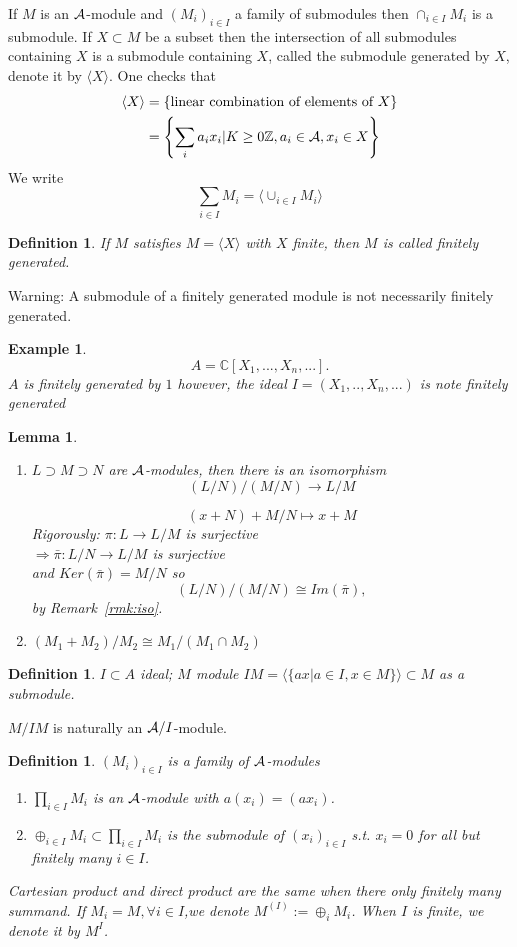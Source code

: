 \documentclass[11pt]{article}
\newtheorem{lemma}[thm]{Lemma}
\newtheorem{dfn}[thm]{Definition}
\newtheorem{ex}[thm]{Example}
\newcommand{\cplx}{\mathbb C}
\newcommand{\intg}{\mathbb Z}
\newcommand{\cala}{{\cal A}}
\newcommand{\rta}{\rightarrow}
\newcommand{\Lrta}{\Longrightarrow}
\newcommand{\lrta}{\longrightarrow}
\newcommand{\lgl}{\langle}
\newcommand{\rgl}{\rangle}
\begin{document}
If $M$ is an $\cala$-module and $(M_i)_{i\in I} $ a family of submodules then $\cap_{i\in I} M_i$ is a submodule.
If $X\subset M$ be a  subset then the intersection of all submodules  containing $X$ is a submodule containing $X$, called the  submodule generated by $X$, denote it by $\lgl X\rgl$.
One checks that 
$$
\begin{aligned}
\lgl X\rgl&=\left\{\text{linear combination of elements of } X\right\}\\
&=\left\{\sum_i a_i x_i|K\geq 0 \intg, a_i\in\cala, x_i\in X\right\}
\end{aligned}
$$
We write 
$$
\sum_{i\in I} M_i=\lgl \cup_{i\in I} M_i\rgl
$$
\begin{dfn}
If $M$ satisfies $M=\lgl X\rgl$ with $X$ finite, then $M$ is called finitely generated.
\end{dfn}
Warning:   A submodule of a finitely generated module is not necessarily finitely generated.
\begin{ex}
$$
A=\cplx[X_1,...,X_n,...].
$$
$A$ is finitely generated by $1$ however, the ideal 
$
I=(X_1,..,X_n,...) $ is note finitely generated
\end{ex}

\begin{lemma}\ 
\begin{enumerate}
    \item $L\supset M\supset N$ are $\cala$-modules, then there is an isomorphism 
    $$
        (L/N)/(M/N)\rta L/M
    $$

    $$
    (x+N)+M/N\mapsto x+M
    $$
    Rigorously:
    $\pi: L\lrta L/M$ is surjective\\
    $\Lrta \bar{\pi} :L/N\rta L/M$ is surjective\\
    and $Ker(\bar{\pi})=M/N$ so
     $$
     (L/N)/(M/N)\cong Im(\bar{\pi}),
     $$
     by Remark~\ref{rmk:iso}.
    \item $(M_1+M_2)/M_2\cong M_1/(M_1\cap M_2)$
\end{enumerate}
\end{lemma}
\begin{dfn}
$I\subset A$ ideal; $M$ module $I M=\lgl \{ax|a\in I,x\in M\}\rgl\subset M$ as a submodule.
\end{dfn}
$M/IM$ is naturally an $\cala/I$-module.

\begin{dfn}
$(M_i)_{i \in I}$ is a family of $\cala$-modules
\begin{enumerate}
\item $\prod_{i\in I} M_i$ is an $\cala$-module with $a(x_i)=(a x_i)$.
\item $\oplus_{i\in I} M_i\subset \prod_{i\in I} M_i$ is the submodule of $(x_i)_{i\in I}$ s.t. $x_i=0$ for all but finitely many $i\in I$. 
\end{enumerate}
Cartesian product and direct product are the same when there only finitely many summand. If $M_i=M,\forall i\in I$,we denote $M^{(I)}:=\oplus_i M_i$. When $I$ is finite, we denote it by $M^I$.
\end{dfn}
\end{document}
